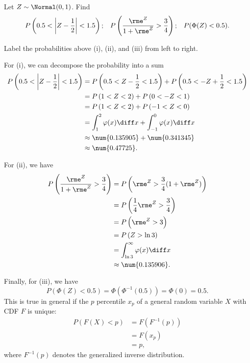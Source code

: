 \begin{problem}[Handout 13, \# 20]
  Let \(Z\sim\Normal(0,1)\). Find
  \[
    \begin{aligned}
      P\left(0.5<\left|Z-\frac{1}{2}\right|<1.5\right);
      && P\left(\frac{\rme^Z}{1+\rme^Z}>\frac{3}{4}\right);
      &&P(\Phi(Z)<0.5).
    \end{aligned}
  \]
\end{problem}
\begin{solution}
  Label the probabilities above (i), (ii), and (iii) from left to
  right.

  For (i), we can decompose the probability into a sum
  \begin{align*}
    P\left(0.5<\left|Z-\frac{1}{2}\right|<1.5\right)%
    &=P\left(0.5<Z-\frac{1}{2}<1.5\right)+%
      P\left(0.5<-Z+\frac{1}{2}<1.5\right)\\
    &=P\left(1<Z<2\right)+%
    P\left(0<-Z<1\right)\\
    &=P\left(1<Z<2\right)+%
      P\left(-1<Z<0\right)\\
    &=\int_1^2\varphi(x)\diff x+\int_{-1}^0\varphi(x)\diff x\\
    &\approx\num{0.135905}+\num{0.341345}\\
    &\approx\num{0.47725}.
  \end{align*}

  For (ii), we have
  \begin{align*}
    P\left(\frac{\rme^Z}{1+\rme^Z}>\frac{3}{4}\right)
    &=P\left(\rme^Z>\frac{3}{4}(1+\rme^Z)\right)\\
    &=P\left(\frac{1}{4}\rme^Z>\frac{3}{4}\right)\\
    &=P\left(\rme^Z>3\right)\\
    &=P\left(Z>\ln 3\right)\\
    &=\int_{\ln 3}^\infty\varphi(x)\diff x\\
    &\approx\num{0.135906}.
  \end{align*}

  Finally, for (iii), we have
  \[
    P(\Phi(Z)<0.5)=\Phi(\Phi^{-1}(0.5))=\Phi(0)=0.5.
  \]
  This is true in general if the \(p\) percentile \(x_p\) of a
  general random variable \(X\) with CDF \(F\) is unique:
  \begin{align*}
    P(F(X)<p)
    &=F(F^{-1}(p))\\
    &=F(x_p)\\
    &=p,
  \end{align*}
  where \(F^{-1}(p)\) denotes the generalized inverse distribution.
\end{solution}
\newpage

